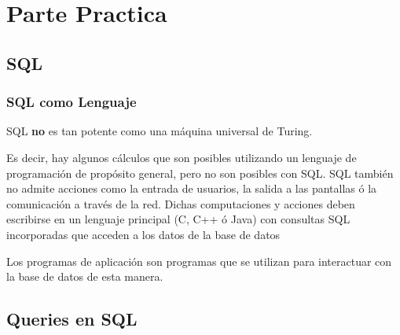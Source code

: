 \documentclass[12pt, fleqn]{report}                             %
\theoremstyle{break}                                            %
\begin{document}
\part{Parte Practica}
\clearpage

    
    \chapter{SQL}

        \clearpage
        \section{SQL como Lenguaje}
            
            SQL \textbf{no} es tan potente como una máquina universal de Turing.

            Es decir, hay algunos cálculos que son posibles utilizando un lenguaje de programación
            de propósito general, pero no son posibles con SQL.
            SQL también no admite acciones como la entrada de usuarios, la salida a las pantallas 
            ó la comunicación a través de la red.
            Dichas computaciones y acciones deben escribirse en un lenguaje principal (C, C++ ó Java)
            con consultas SQL incorporadas que acceden a los datos de la base de datos

            Los programas de aplicación son programas que se utilizan para interactuar con la base de datos de esta manera.



    \chapter{Queries en SQL}
    \clearpage

\end{document}
